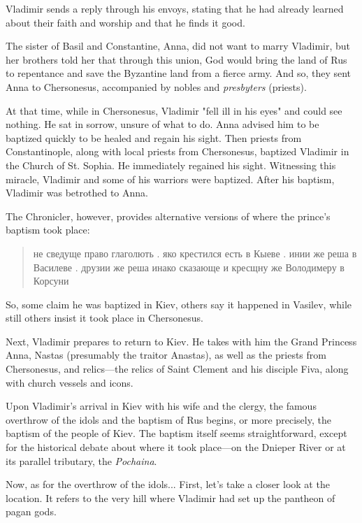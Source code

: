 \documentclass[a5paper,11pt,openany]{article}
\begin{document}
Vladimir sends a reply through his envoys, stating that he had already learned about their faith and worship and that he finds it good.

The sister of Basil and Constantine, Anna, did not want to marry Vladimir, but her brothers told her that through this union, God would bring the land of Rus to repentance and save the Byzantine land from a fierce army. And so, they sent Anna to Chersonesus, accompanied by nobles and \textit{presbyters} (priests).

At that time, while in Chersonesus, Vladimir "fell ill in his eyes" and could see nothing. He sat in sorrow, unsure of what to do. Anna advised him to be baptized quickly to be healed and regain his sight. Then priests from Constantinople, along with local priests from Chersonesus, baptized Vladimir in the Church of St. Sophia. He immediately regained his sight. Witnessing this miracle, Vladimir and some of his warriors were baptized. After his baptism, Vladimir was betrothed to Anna.

The Chronicler, however, provides alternative versions of where the prince’s baptism took place:

\begin{quotation}
\noindent не сведуще право глаголють . яко крестился есть в Кыеве . инии же реша в Василеве . друзии же реша инако сказающе и кресщну же Володимеру в Корсуни
\end{quotation}

So, some claim he was baptized in Kiev, others say it happened in Vasilev, while still others insist it took place in Chersonesus.

Next, Vladimir prepares to return to Kiev. He takes with him the Grand Princess Anna, Nastas (presumably the traitor Anastas), as well as the priests from Chersonesus, and relics—the relics of Saint Clement and his disciple Fiva, along with church vessels and icons.

Upon Vladimir’s arrival in Kiev with his wife and the clergy, the famous overthrow of the idols and the baptism of Rus begins, or more precisely, the baptism of the people of Kiev. The baptism itself seems straightforward, except for the historical debate about where it took place—on the Dnieper River or at its parallel tributary, the \textit{Pochaina}.

Now, as for the overthrow of the idols... First, let’s take a closer look at the location. It refers to the very hill where Vladimir had set up the pantheon of pagan gods.
\end{document}

